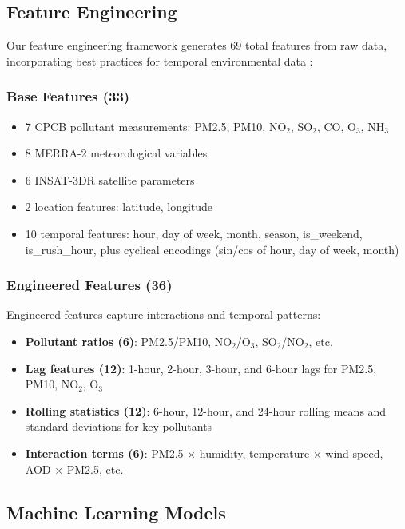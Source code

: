 \documentclass[12pt]{article}
\begin{document}
\subsection{Feature Engineering}

Our feature engineering framework generates 69 total features from raw data, incorporating best practices for temporal environmental data \citep{zhao2024feature,smith2024temporal}:

\subsubsection{Base Features (33)}

\begin{itemize}
\item 7 CPCB pollutant measurements: PM2.5, PM10, NO$_2$, SO$_2$, CO, O$_3$, NH$_3$
\item 8 MERRA-2 meteorological variables
\item 6 INSAT-3DR satellite parameters
\item 2 location features: latitude, longitude
\item 10 temporal features: hour, day of week, month, season, is\_weekend, is\_rush\_hour, plus cyclical encodings (sin/cos of hour, day of week, month)
\end{itemize}

\subsubsection{Engineered Features (36)}

Engineered features capture interactions and temporal patterns:

\begin{itemize}
\item \textbf{Pollutant ratios (6)}: PM2.5/PM10, NO$_2$/O$_3$, SO$_2$/NO$_2$, etc.
\item \textbf{Lag features (12)}: 1-hour, 2-hour, 3-hour, and 6-hour lags for PM2.5, PM10, NO$_2$, O$_3$
\item \textbf{Rolling statistics (12)}: 6-hour, 12-hour, and 24-hour rolling means and standard deviations for key pollutants
\item \textbf{Interaction terms (6)}: PM2.5 × humidity, temperature × wind speed, AOD × PM2.5, etc.
\end{itemize}

\subsection{Machine Learning Models}
\end{document}
